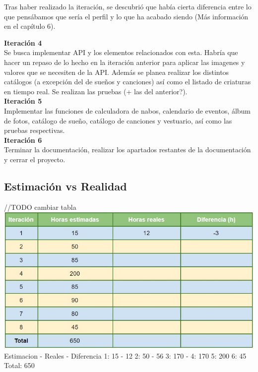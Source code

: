 Tras haber realizado la iteración, se descubrió que había cierta diferencia entre lo que pensábamos que sería el perfil y lo que ha acabado siendo (Más información en el capítulo 6).

\textbf{Iteración 4}\\

Se busca implementar API y los elementos relacionados con esta. Habría que hacer un repaso de lo hecho en la iteración anterior para aplicar las imagenes y valores que se necesiten de la API. Además se planea realizar los distintos catálogos (a excepción del de sueños y canciones) así como el listado de criaturas en tiempo real. Se realizan las pruebas (+ las del anterior?).\\

\textbf{Iteración 5}\\

Implementar las funciones de calculadora de nabos, calendario de eventos, álbum de fotos, catálogo de sueño, catálogo de canciones y vestuario, así como las pruebas respectivas.\\

\textbf{Iteración 6}\\

Terminar la documentación, realizar los apartados restantes de la documentación y cerrar el proyecto.\\

\subsection{Estimación vs Realidad}

//TODO cambiar tabla
\includegraphics[width=\textwidth]{img/cap4/analisistiempo.jpg}
	Estimacion  -  Reales  -  Diferencia
1:      15      -    12
2:      50	    -    56
3:	   170      -
4:	   170
5:     200
6:     45
Total: 650

